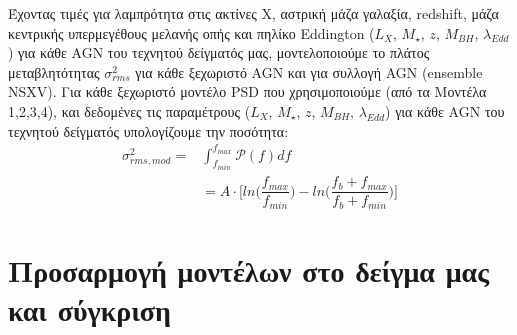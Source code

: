 Έχοντας τιμές για λαμπρότητα στις ακτίνες Χ, αστρική μάζα γαλαξία, \textlatin{redshift}, μάζα κεντρικής υπερμεγέθους μελανής οπής και πηλίκο \textlatin{Eddington} ($L_X$, $M_{\star}$, $z$, $M_{BH}$, $\lambda_{Edd}$) για κάθε \textlatin{AGN} του τεχνητού δείγματός μας, μοντελοποιούμε το πλάτος μεταβλητότητας $\sigma_{rms}^2$ για κάθε ξεχωριστό \textlatin{AGN} και για συλλογή \textlatin{AGN} (\textlatin{ensemble NSXV}). Για κάθε ξεχωριστό μοντέλο \textlatin{PSD} που χρησιμοποιούμε (από τα Μοντέλα 1,2,3,4), και δεδομένες τις παραμέτρους ($L_X$, $M_{\star}$, $z$, $M_{BH}$, $\lambda_{Edd}$) για κάθε \textlatin{AGN} του τεχνητού δείγματός υπολογίζουμε την ποσότητα\cite{2017MNRAS.471.4398P}:
\begin{equation} \begin{aligned} \sigma_{rms, mod}^2 = {} & \int_{f_{min}}^{f_{max}} \mathcal{P}(f)df \\ & = A \cdot \Big[ ln \Big( \dfrac{f_{max}}{f_{min}} \Big) - ln \Big(   \dfrac{f_b + f_{max}}{f_b + f_{min}}  \Big)   \Big] \label{eq:NXSVmod} \end{aligned}\end{equation}

\section{Προσαρμογή μοντέλων στο δείγμα μας και σύγκριση}

